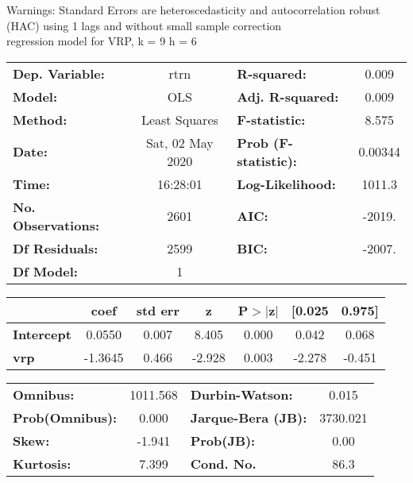 Warnings: \newline
 [1] Standard Errors are heteroscedasticity and autocorrelation robust (HAC) using 1 lags and without small sample correction\\ 

regression model for VRP, k = 9 h = 6\begin{center}
\begin{tabular}{lclc}
\toprule
\textbf{Dep. Variable:}    &       rtrn       & \textbf{  R-squared:         } &     0.009   \\
\textbf{Model:}            &       OLS        & \textbf{  Adj. R-squared:    } &     0.009   \\
\textbf{Method:}           &  Least Squares   & \textbf{  F-statistic:       } &     8.575   \\
\textbf{Date:}             & Sat, 02 May 2020 & \textbf{  Prob (F-statistic):} &  0.00344    \\
\textbf{Time:}             &     16:28:01     & \textbf{  Log-Likelihood:    } &    1011.3   \\
\textbf{No. Observations:} &        2601      & \textbf{  AIC:               } &    -2019.   \\
\textbf{Df Residuals:}     &        2599      & \textbf{  BIC:               } &    -2007.   \\
\textbf{Df Model:}         &           1      & \textbf{                     } &             \\
\bottomrule
\end{tabular}
\begin{tabular}{lcccccc}
                   & \textbf{coef} & \textbf{std err} & \textbf{z} & \textbf{P$> |$z$|$} & \textbf{[0.025} & \textbf{0.975]}  \\
\midrule
\textbf{Intercept} &       0.0550  &        0.007     &     8.405  &         0.000        &        0.042    &        0.068     \\
\textbf{vrp}       &      -1.3645  &        0.466     &    -2.928  &         0.003        &       -2.278    &       -0.451     \\
\bottomrule
\end{tabular}
\begin{tabular}{lclc}
\textbf{Omnibus:}       & 1011.568 & \textbf{  Durbin-Watson:     } &    0.015  \\
\textbf{Prob(Omnibus):} &   0.000  & \textbf{  Jarque-Bera (JB):  } & 3730.021  \\
\textbf{Skew:}          &  -1.941  & \textbf{  Prob(JB):          } &     0.00  \\
\textbf{Kurtosis:}      &   7.399  & \textbf{  Cond. No.          } &     86.3  \\
\bottomrule
\end{tabular}
\end{center}

